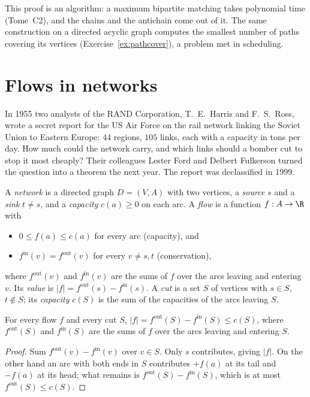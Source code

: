 This proof is an algorithm: a maximum bipartite matching takes polynomial time (Tome~C2), and the chains and the antichain
come out of it. The same construction on a directed acyclic graph computes the smallest number of paths covering its
vertices (Exercise~\ref{ex:pathcover}), a problem met in scheduling.

\section{Flows in networks}\label{sec:flows}

In 1955 two analysts of the RAND Corporation, T.~E.~Harris and F.~S.~Ross, wrote a secret report for the US Air Force on the
rail network linking the Soviet Union to Eastern Europe: $44$ regions, $105$ links, each with a capacity in tons per day. How much
could the network carry, and which links should a bomber cut to stop it most cheaply? Their colleagues Lester Ford and Delbert
Fulkerson turned the question into a theorem the next year. The report was declassified in 1999.

A \emph{network} is a directed graph $D=(V,A)$ with two vertices, a \emph{source} $s$ and a \emph{sink} $t\ne s$, and a \emph{capacity} $c(a)\ge0$
on each arc. A \emph{flow} is a function $f:A\to\R$ with
\begin{itemize}
\item $0\le f(a)\le c(a)$ for every arc (capacity), and
\item $f^{\mathrm{in}}(v)=f^{\mathrm{out}}(v)$ for every $v\ne s,t$ (conservation),
\end{itemize}
where $f^{\mathrm{out}}(v)$ and $f^{\mathrm{in}}(v)$ are the sums of $f$ over the arcs leaving and entering $v$. Its \emph{value} is
$|f|=f^{\mathrm{out}}(s)-f^{\mathrm{in}}(s)$. A \emph{cut} is a set $S$ of vertices with $s\in S$, $t\notin S$; its \emph{capacity} $c(S)$ is the sum
of the capacities of the arcs leaving $S$.

\begin{lemma}\label{lem:weakduality}
For every flow $f$ and every cut $S$, $|f|=f^{\mathrm{out}}(S)-f^{\mathrm{in}}(S)\le c(S)$, where $f^{\mathrm{out}}(S)$ and $f^{\mathrm{in}}(S)$ are the
sums of $f$ over the arcs leaving and entering $S$.
\end{lemma}
\begin{proof}
Sum $f^{\mathrm{out}}(v)-f^{\mathrm{in}}(v)$ over $v\in S$. Only $s$ contributes, giving $|f|$. On the other hand an arc with both ends in $S$ contributes
$+f(a)$ at its tail and $-f(a)$ at its head; what remains is $f^{\mathrm{out}}(S)-f^{\mathrm{in}}(S)$, which is at most
$f^{\mathrm{out}}(S)\le c(S)$.
\end{proof}


